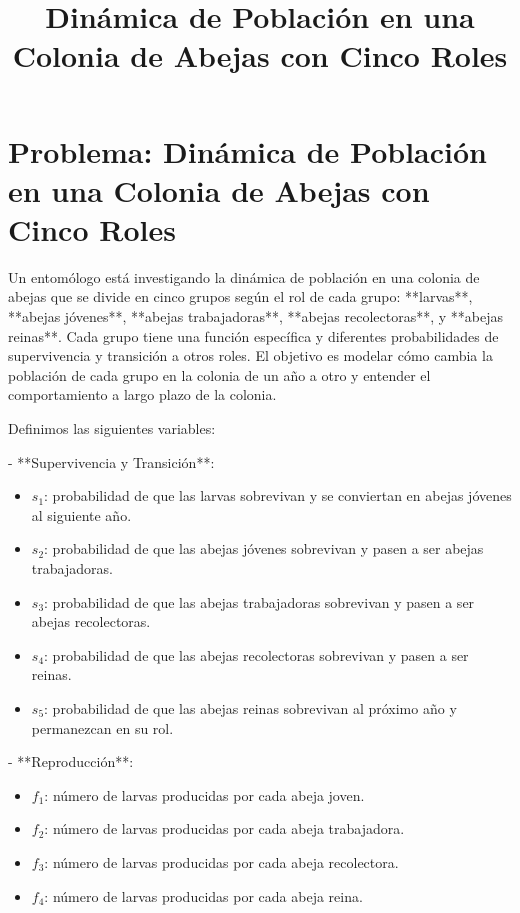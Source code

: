 \documentclass{article}
\begin{document}
\title{Dinámica de Población en una Colonia de Abejas con Cinco Roles}
\author{}
\date{}
\maketitle

\section*{Problema: Dinámica de Población en una Colonia de Abejas con Cinco Roles}

Un entomólogo está investigando la dinámica de población en una colonia de abejas que se divide en cinco grupos según el rol de cada grupo: **larvas**, **abejas jóvenes**, **abejas trabajadoras**, **abejas recolectoras**, y **abejas reinas**. Cada grupo tiene una función específica y diferentes probabilidades de supervivencia y transición a otros roles. El objetivo es modelar cómo cambia la población de cada grupo en la colonia de un año a otro y entender el comportamiento a largo plazo de la colonia.

Definimos las siguientes variables:

- **Supervivencia y Transición**:
  \begin{itemize}
      \item \( s_1 \): probabilidad de que las larvas sobrevivan y se conviertan en abejas jóvenes al siguiente año.
      \item \( s_2 \): probabilidad de que las abejas jóvenes sobrevivan y pasen a ser abejas trabajadoras.
      \item \( s_3 \): probabilidad de que las abejas trabajadoras sobrevivan y pasen a ser abejas recolectoras.
      \item \( s_4 \): probabilidad de que las abejas recolectoras sobrevivan y pasen a ser reinas.
      \item \( s_5 \): probabilidad de que las abejas reinas sobrevivan al próximo año y permanezcan en su rol.
  \end{itemize}

- **Reproducción**:
  \begin{itemize}
      \item \( f_1 \): número de larvas producidas por cada abeja joven.
      \item \( f_2 \): número de larvas producidas por cada abeja trabajadora.
      \item \( f_3 \): número de larvas producidas por cada abeja recolectora.
      \item \( f_4 \): número de larvas producidas por cada abeja reina.
  \end{itemize}
\end{document}
